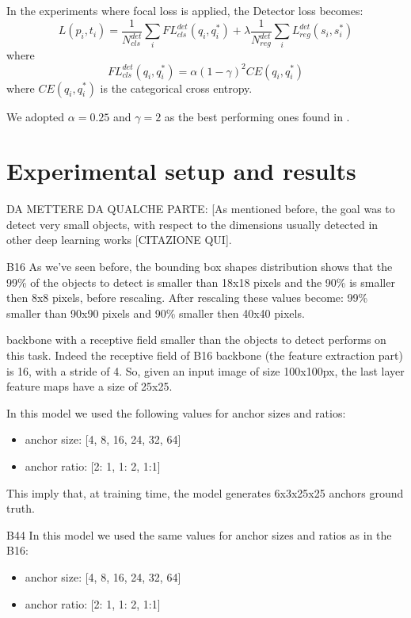 \documentclass[a4paper,10pt]{report}
\begin{document}
In the experiments where focal loss is applied, the Detector loss becomes:
\[L({p_i}, {t_i}) = \dfrac{1}{N_{cls}^{det}} \sum_{i} FL_{cls}^{det}(q_i, q_i^*) + \lambda \dfrac{1}{N_{reg}^{det}} \sum_{i}L_{reg}^{det}(s_i, s_i^*) \]
where
\[FL_{cls}^{det}(q_i, q_i^*) = \alpha (1-\gamma)^2 CE(q_i, q_i^*)\]
where $CE(q_i, q_i^*)$ is the categorical cross entropy. 

We adopted $\alpha=0.25$ and $\gamma=2$ as the best performing ones found in \cite{focal-loss}.

\chapter{Experimental setup and results}\label{chap:experiments}
 
 DA METTERE DA QUALCHE PARTE:
 [As mentioned before, the goal was to detect very small objects, with respect to the dimensions usually detected in other deep learning works [CITAZIONE QUI].


B16
As we've seen before, the bounding box shapes distribution shows that the 99\% of the objects to detect is smaller than 18x18 pixels and the 90\% is smaller then 8x8 pixels, before rescaling.
After rescaling these values become: 99\% smaller than 90x90 pixels and 90\% smaller then 40x40 pixels.

backbone with a receptive field smaller than the objects to detect performs on this task.
Indeed the receptive field of B16 backbone (the feature extraction part) is 16, with a stride of 4. So, given an input image of size 100x100px, the last layer feature maps have a size of 25x25.

In this model we used the following values for anchor sizes and ratios:
\begin{itemize}
  \item anchor size: [4, 8, 16, 24, 32, 64]
  \item anchor ratio: [2: 1, 1: 2, 1:1]
\end{itemize}

This imply that, at training time, the model generates 6x3x25x25 anchors ground truth.

B44
In this model we used the same values for anchor sizes and ratios as in the B16:
\begin{itemize}
  \item anchor size: [4, 8, 16, 24, 32, 64]
  \item anchor ratio: [2: 1, 1: 2, 1:1]
\end{itemize}
\end{document}
